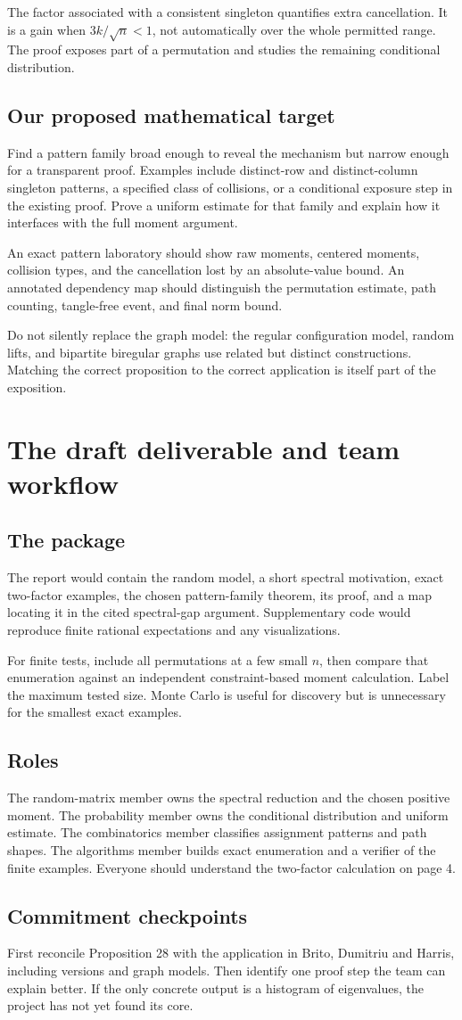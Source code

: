 \documentclass[11pt,letterpaper]{article}
\newcommand{\Page}[1]{\clearpage\section*{#1}}
\newcommand{\Sub}[1]{\subsection*{#1}}
\begin{document}
The factor associated with a consistent singleton quantifies extra cancellation. It is a gain when $3k/\sqrt n<1$, not automatically over the whole permitted range. The proof exposes part of a permutation and studies the remaining conditional distribution.

\Sub{Our proposed mathematical target}
Find a pattern family broad enough to reveal the mechanism but narrow enough for a transparent proof. Examples include distinct-row and distinct-column singleton patterns, a specified class of collisions, or a conditional exposure step in the existing proof. Prove a uniform estimate for that family and explain how it interfaces with the full moment argument.

An exact pattern laboratory should show raw moments, centered moments, collision types, and the cancellation lost by an absolute-value bound. An annotated dependency map should distinguish the permutation estimate, path counting, tangle-free event, and final norm bound.

Do not silently replace the graph model: the regular configuration model, random lifts, and bipartite biregular graphs use related but distinct constructions. Matching the correct proposition to the correct application is itself part of the exposition.

\Page{The draft deliverable and team workflow}
\Sub{The package}
The report would contain the random model, a short spectral motivation, exact two-factor examples, the chosen pattern-family theorem, its proof, and a map locating it in the cited spectral-gap argument. Supplementary code would reproduce finite rational expectations and any visualizations.

For finite tests, include all permutations at a few small $n$, then compare that enumeration against an independent constraint-based moment calculation. Label the maximum tested size. Monte Carlo is useful for discovery but is unnecessary for the smallest exact examples.

\Sub{Roles}
The random-matrix member owns the spectral reduction and the chosen positive moment. The probability member owns the conditional distribution and uniform estimate. The combinatorics member classifies assignment patterns and path shapes. The algorithms member builds exact enumeration and a verifier of the finite examples. Everyone should understand the two-factor calculation on page 4.

\Sub{Commitment checkpoints}
First reconcile Proposition 28 with the application in Brito, Dumitriu and Harris, including versions and graph models. Then identify one proof step the team can explain better. If the only concrete output is a histogram of eigenvalues, the project has not yet found its core.
\end{document}
